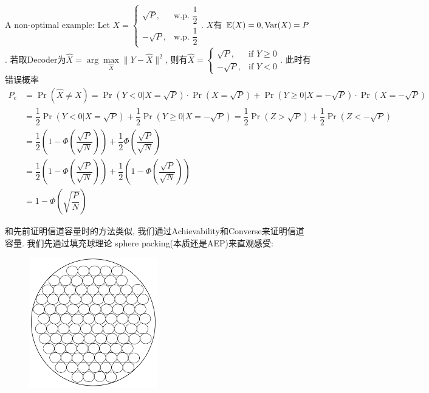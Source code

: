 \begin{example}
A non-optimal example: Let $X=\begin{cases}
\sqrt{P}, &\text{w.p. } \dfrac{1}{2} \\
-\sqrt{P}, &\text{w.p. } \dfrac{1}{2}
\end{cases}$. $X$有 $\mathbb{E}(X)=0, \operatorname{Var}(X)=P$.
若取Decoder为$\hat{X}=\arg\max\limits_{\hat{X}}\|Y-\hat{X}\|^2$, 则有$\hat{X}=\begin{cases}
\sqrt{P}, &\text{if } Y\geq 0 \\
-\sqrt{P}, &\text{if } Y<0
\end{cases}$. 此时有错误概率
\begin{align*}
P_e &= \Pr(\hat{X}\neq X) = \Pr(Y<0|X=\sqrt{P})\cdot\Pr(X=\sqrt{P}) + \Pr(Y\geq 0|X=-\sqrt{P})\cdot\Pr(X=-\sqrt{P}) \\
&= \dfrac{1}{2}\Pr(Y<0|X=\sqrt{P}) + \dfrac{1}{2}\Pr(Y\geq 0|X=-\sqrt{P}) = \dfrac{1}{2}\Pr(Z>\sqrt{P}) + \dfrac{1}{2}\Pr(Z<-\sqrt{P}) \\
&= \dfrac{1}{2}\left(1-\Phi\left(\dfrac{\sqrt{P}}{\sqrt{N}}\right)\right) + \dfrac{1}{2}\Phi\left(\dfrac{\sqrt{P}}{\sqrt{N}}\right) \\
&= \dfrac{1}{2}\left(1-\Phi\left(\dfrac{\sqrt{P}}{\sqrt{N}}\right)\right) + \dfrac{1}{2}\left(1-\Phi\left(\dfrac{\sqrt{P}}{\sqrt{N}}\right)\right) \\
&= 1-\Phi\left(\sqrt{\dfrac{P}{N}}\right)
\end{align*}
\end{example}
和先前证明信道容量时的方法类似, 我们通过Achievability和Converse来证明信道容量. 我们先通过填充球理论 sphere packing(本质还是AEP)来直观感受:
\begin{figure}[htbp]
    \centering
    \includegraphics[width=0.5\textwidth]{./figures/chapter7/sphere_picking.png}
\end{figure}

